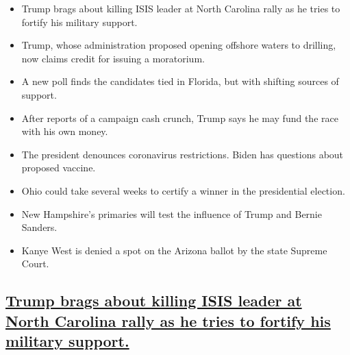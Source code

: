 \begin{itemize}
\item
  \protect\hyperlink{trump-brags-about-killing-isis-leader-at-north-carolina-rally-as-he-tries-to-fortify-his-military-support}{}

  Trump brags about killing ISIS leader at North Carolina rally as he
  tries to fortify his military support.
\item
  \protect\hyperlink{trump-whose-administration-proposed-opening-offshore-waters-to-drilling-now-claims-credit-for-issuing-a-moratorium}{}

  Trump, whose administration proposed opening offshore waters to
  drilling, now claims credit for issuing a moratorium.
\item
  \protect\hyperlink{a-new-poll-finds-the-candidates-tied-in-florida-but-with-shifting-sources-of-support}{}

  A new poll finds the candidates tied in Florida, but with shifting
  sources of support.
\item
  \protect\hyperlink{after-reports-of-a-campaign-cash-crunch-trump-says-he-may-fund-the-race-with-his-own-money}{}

  After reports of a campaign cash crunch, Trump says he may fund the
  race with his own money.
\item
  \protect\hyperlink{the-president-denounces-coronavirus-restrictions-biden-has-questions-about-proposed-vaccine}{}

  The president denounces coronavirus restrictions. Biden has questions
  about proposed vaccine.
\item
  \protect\hyperlink{ohio-could-take-several-weeks-to-certify-a-winner-in-the-presidential-election}{}

  Ohio could take several weeks to certify a winner in the presidential
  election.
\item
  \protect\hyperlink{new-hampshires-primaries-will-test-the-influence-of-trump-and-bernie-sanders}{}

  New Hampshire's primaries will test the influence of Trump and Bernie
  Sanders.
\item
  \protect\hyperlink{kanye-west-is-denied-a-spot-on-the-arizona-ballot-by-the-state-supreme-court}{}

  Kanye West is denied a spot on the Arizona ballot by the state Supreme
  Court.
\end{itemize}

\hypertarget{trump-brags-about-killing-isis-leader-at-north-carolina-rally-as-he-tries-to-fortify-his-military-support}{%
\subsection{\texorpdfstring{\protect\hyperlink{trump-brags-about-killing-isis-leader-at-north-carolina-rally-as-he-tries-to-fortify-his-military-support}{Trump
brags about killing ISIS leader at North Carolina rally as he tries to
fortify his military
support.}}{Trump brags about killing ISIS leader at North Carolina rally as he tries to fortify his military support.}}\label{trump-brags-about-killing-isis-leader-at-north-carolina-rally-as-he-tries-to-fortify-his-military-support}}

